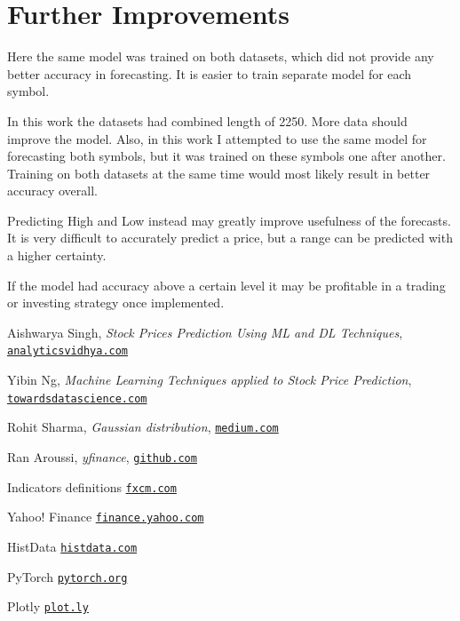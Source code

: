 \documentclass[a4paper,12pt]{article}
\begin{document}
\section{Further Improvements}
Here the same model was trained on both datasets, which did not provide any better accuracy in forecasting.
It is easier to train separate model for each symbol.

In this work the datasets had combined length of 2250. More data should improve the model.
Also, in this work I attempted to use the same model for forecasting both symbols, but it was trained on these symbols one after another. Training on both datasets at the same time would most likely result in better accuracy overall.

Predicting High and Low instead may greatly improve usefulness of the forecasts. It is very difficult to accurately predict a price, but a range can be predicted with a higher certainty.

If the model had accuracy above a certain level it may be profitable in a trading or investing strategy once implemented.


\pagebreak
\begin{thebibliography}{15}
	
Aishwarya Singh, \textit{Stock Prices Prediction Using ML and DL Techniques},
\texttt{\href{https://www.analyticsvidhya.com/blog/2018/10/predicting-stock-price-machine-learningnd-deep-learning-techniques-python/}{analyticsvidhya.com}}

Yibin Ng, \textit{Machine Learning Techniques applied to Stock Price Prediction}, \texttt{\href{https://towardsdatascience.com/machine-learning-techniques-applied-to-stock-price-prediction-6c1994da8001}{towardsdatascience.com}}

Rohit Sharma, \textit{Gaussian distribution}, \texttt{\href{https://medium.com/ai-techsystems/gaussian-distribution-why-is-it-important-in-data-science-and-machine-learning-9adbe0e5f8ac}{medium.com}}


Ran Aroussi, \textit{yfinance}, \texttt{\href{https://github.com/ranaroussi/yfinance}{github.com}}

Indicators definitions
\texttt{\href{https://www.fxcm.com/uk/insights/learn-forex-oscillators-and-momentum-indicators/}{fxcm.com}}

Yahoo! Finance
\texttt{\href{https://finance.yahoo.com}{finance.yahoo.com}}

HistData
\texttt{\href{http://histdata.com}{histdata.com}}

PyTorch
\texttt{\href{https://pytorch.org/}{pytorch.org}}

Plotly
\texttt{\href{https://plot.ly/javascript/}{plot.ly}}

\end{thebibliography}
\end{document}

